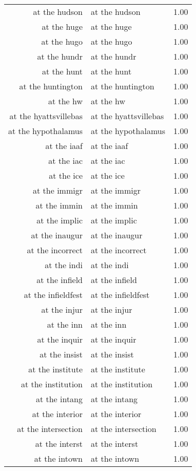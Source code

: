 \begin{table}[ht]
\begin{tabular}{rlr}
  at the hudson & at the hudson & 1.00 \\ 
  at the huge & at the huge & 1.00 \\ 
  at the hugo & at the hugo & 1.00 \\ 
  at the hundr & at the hundr & 1.00 \\ 
  at the hunt & at the hunt & 1.00 \\ 
  at the huntington & at the huntington & 1.00 \\ 
  at the hw & at the hw & 1.00 \\ 
  at the hyattsvillebas & at the hyattsvillebas & 1.00 \\ 
  at the hypothalamus & at the hypothalamus & 1.00 \\ 
  at the iaaf & at the iaaf & 1.00 \\ 
  at the iac & at the iac & 1.00 \\ 
  at the ice & at the ice & 1.00 \\ 
  at the immigr & at the immigr & 1.00 \\ 
  at the immin & at the immin & 1.00 \\ 
  at the implic & at the implic & 1.00 \\ 
  at the inaugur & at the inaugur & 1.00 \\ 
  at the incorrect & at the incorrect & 1.00 \\ 
  at the indi & at the indi & 1.00 \\ 
  at the infield & at the infield & 1.00 \\ 
  at the infieldfest & at the infieldfest & 1.00 \\ 
  at the injur & at the injur & 1.00 \\ 
  at the inn & at the inn & 1.00 \\ 
  at the inquir & at the inquir & 1.00 \\ 
  at the insist & at the insist & 1.00 \\ 
  at the institute & at the institute & 1.00 \\ 
  at the institution & at the institution & 1.00 \\ 
  at the intang & at the intang & 1.00 \\ 
  at the interior & at the interior & 1.00 \\ 
  at the intersection & at the intersection & 1.00 \\ 
  at the interst & at the interst & 1.00 \\ 
  at the intown & at the intown & 1.00 \\ 

\end{tabular}
\end{table}
